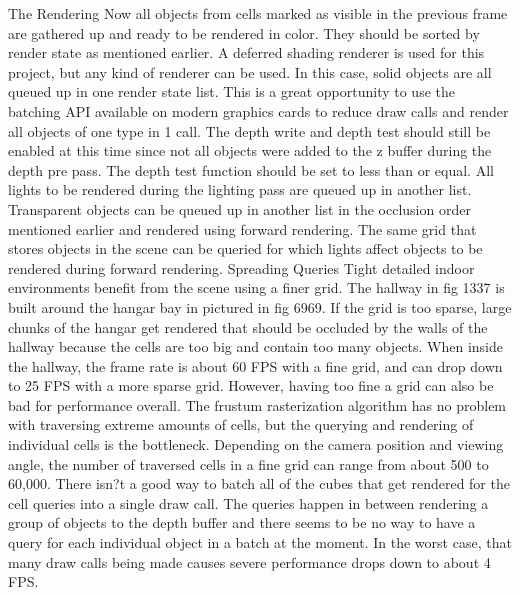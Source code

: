 \documentclass[12pt]{ucthesis}
\begin{document}
The Rendering
Now all objects from cells marked as visible in the previous frame are gathered up and ready to be rendered in color.  They should be sorted by render state as mentioned earlier.  A deferred shading renderer is used for this project, but any kind of renderer can be used.  In this case, solid objects are all queued up in one render state list.  This is a great opportunity to use the batching API available on modern graphics cards to reduce draw calls and render all objects of one type in 1 call.  The depth write and depth test should still be enabled at this time since not all objects were added to the z buffer during the depth pre pass.  The depth test function should be set to less than or equal.  All lights to be rendered during the lighting pass are queued up in another list.  Transparent objects can be queued up in another list in the occlusion order mentioned earlier and rendered using forward rendering.  The same grid that stores objects in the scene can be queried for which lights affect objects to be rendered during forward rendering.
Spreading Queries
Tight detailed indoor environments benefit from the scene using a finer grid.  The hallway in fig 1337 is built around the hangar bay in pictured in fig 6969.  If the grid is too sparse, large chunks of the hangar get rendered that should be occluded by the walls of the hallway because the cells are too big and contain too many objects. 
When inside the hallway, the frame rate is about 60 FPS with a fine grid, and can drop down to 25 FPS with a more sparse grid.  However, having too fine a grid can also be bad for performance overall.  The frustum rasterization algorithm has no problem with traversing extreme amounts of cells, but the querying and rendering of individual cells is the bottleneck.  Depending on the camera position and viewing angle, the number of traversed cells in a fine grid can range from about 500 to 60,000.  There isn?t a good way to batch all of the cubes that get rendered for the cell queries into a single draw call.  The queries happen in between rendering a group of objects to the depth buffer and there seems to be no way to have a query for each individual object in a batch at the moment.  In the worst case, that many draw calls being made causes severe performance drops down to about 4 FPS.
\end{document}
